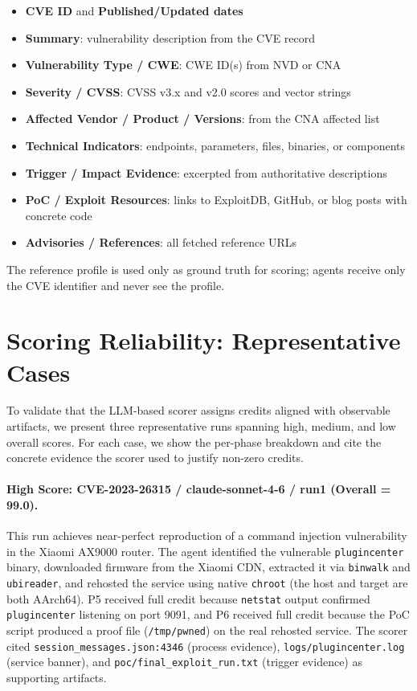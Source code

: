 \begin{itemize}
\item \textbf{CVE ID} and \textbf{Published/Updated dates}
\item \textbf{Summary}: vulnerability description from the CVE record
\item \textbf{Vulnerability Type / CWE}: CWE ID(s) from NVD or CNA
\item \textbf{Severity / CVSS}: CVSS v3.x and v2.0 scores and vector strings
\item \textbf{Affected Vendor / Product / Versions}: from the CNA affected list
\item \textbf{Technical Indicators}: endpoints, parameters, files, binaries, or components
\item \textbf{Trigger / Impact Evidence}: excerpted from authoritative descriptions
\item \textbf{PoC / Exploit Resources}: links to ExploitDB, GitHub, or blog posts with concrete code
\item \textbf{Advisories / References}: all fetched reference URLs
\end{itemize}

The reference profile is used only as ground truth for scoring; agents receive only the CVE identifier and never see the profile.


\section{Scoring Reliability: Representative Cases}
\label{app:cases}

To validate that the LLM-based scorer assigns credits aligned with observable artifacts, we present three representative runs spanning high, medium, and low overall scores. For each case, we show the per-phase breakdown and cite the concrete evidence the scorer used to justify non-zero credits.

\paragraph{High Score: CVE-2023-26315 / claude-sonnet-4-6 / run1 (Overall = 99.0).}
This run achieves near-perfect reproduction of a command injection vulnerability in the Xiaomi AX9000 router. The agent identified the vulnerable \texttt{plugincenter} binary, downloaded firmware from the Xiaomi CDN, extracted it via \texttt{binwalk} and \texttt{ubireader}, and rehosted the service using native \texttt{chroot} (the host and target are both AArch64). P5 received full credit because \texttt{netstat} output confirmed \texttt{plugincenter} listening on port 9091, and P6 received full credit because the PoC script produced a proof file (\texttt{/tmp/pwned}) on the real rehosted service. The scorer cited \texttt{session\_messages.json:4346} (process evidence), \texttt{logs/plugincenter.log} (service banner), and \texttt{poc/final\_exploit\_run.txt} (trigger evidence) as supporting artifacts.

